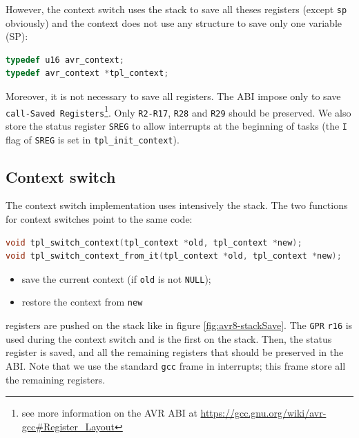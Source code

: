 However, the context switch uses the stack to save all theses registers (except \texttt{sp} obviously) and the context does not use any structure to save only one variable (SP):
\begin{lstlisting}[language=C]
typedef u16 avr_context;
typedef avr_context *tpl_context;
\end{lstlisting}

Moreover, it is not necessary to save all registers. The ABI impose only to save \texttt{call-Saved Registers}\footnote{see more information on the AVR ABI at \url{https://gcc.gnu.org/wiki/avr-gcc\#Register\_Layout}}. Only \texttt{R2-R17}, \texttt{R28} and \texttt{R29} should be preserved. We also store the status register \texttt{SREG} to allow interrupts at the beginning of tasks (the \texttt{I} flag of \texttt{SREG} is set in \texttt{tpl_init_context}).

\subsection{Context switch}
The context switch implementation uses intensively the stack. The two functions for context switches point to the same code:

\begin{lstlisting}[language=C]
void tpl_switch_context(tpl_context *old, tpl_context *new);
void tpl_switch_context_from_it(tpl_context *old, tpl_context *new);
\end{lstlisting}

\begin{itemize}
\item save the current context (if \texttt{old} is not \texttt{NULL});
\item restore the context from \texttt{new}
\end{itemize}

registers are pushed on the stack like in figure \ref{fig:avr8-stackSave}. The \texttt{GPR} \texttt{r16} is used during the context switch and is the first on the stack. Then, the status register is saved, and all the remaining registers that should be preserved in the ABI. Note that we use the standard \texttt{gcc} frame in interrupts; this frame store all the remaining registers.

